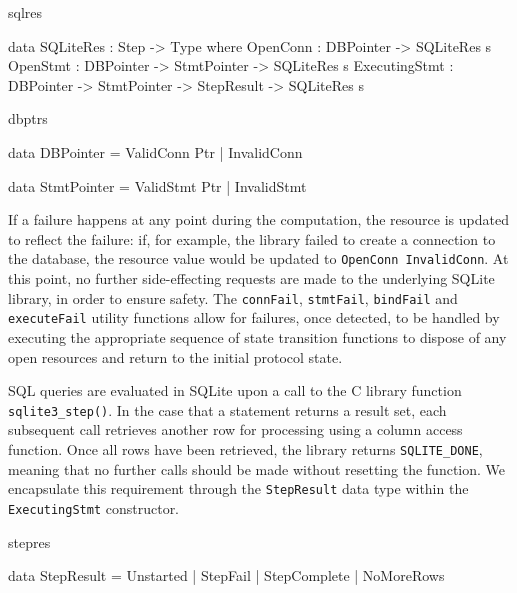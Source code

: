 \begin{SaveVerbatim}{sqlres}

data SQLiteRes : Step -> Type where
  OpenConn : DBPointer -> SQLiteRes s
  OpenStmt : DBPointer -> StmtPointer -> SQLiteRes s
  ExecutingStmt : DBPointer ->  StmtPointer -> 
                  StepResult -> SQLiteRes s

\end{SaveVerbatim}

\begin{SaveVerbatim}{dbptrs}

data DBPointer = ValidConn Ptr
               | InvalidConn

data StmtPointer = ValidStmt Ptr
                 | InvalidStmt 

\end{SaveVerbatim}

\noindent
If a failure happens at any point during the computation, the resource is
updated to reflect the failure: if, for example, the library failed to create a
connection to the database, the resource value would be updated to
\texttt{OpenConn InvalidConn}. At this point, no further side-effecting
requests are made to the underlying SQLite library, in order to ensure safety.
The \texttt{connFail}, \texttt{stmtFail}, \texttt{bindFail} and
\texttt{executeFail} utility functions allow for failures, once detected, to be
handled by executing the appropriate sequence of state transition functions to
dispose of any open resources and return to the initial protocol state. 

SQL queries are evaluated in SQLite upon a call to the C library function
\texttt{sqlite3\_step()}. In the case that a statement returns a result set,
each subsequent call retrieves another row for processing using a column access
function. Once all rows have been retrieved, the library returns
\texttt{SQLITE\_DONE}, meaning that no further calls should be made without
resetting the function. We encapsulate this requirement through the
\texttt{StepResult} data type within the \texttt{ExecutingStmt} constructor. 

\begin{SaveVerbatim}{stepres}

data StepResult = Unstarted    | StepFail
                | StepComplete | NoMoreRows

\end{SaveVerbatim}

